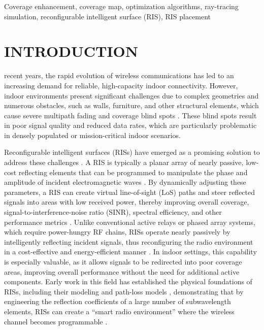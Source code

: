 \documentclass{IEEEoj}
\begin{document}
\begin{IEEEkeywords}
Coverage enhancement, coverage map, optimization algorithms, ray-tracing simulation, reconfigurable intelligent surface (RIS), RIS placement
\end{IEEEkeywords}


\maketitle

\section{INTRODUCTION}
 recent years, the rapid evolution of wireless communications has led to an increasing demand for reliable, high-capacity indoor connectivity. However, indoor environments present significant challenges due to complex geometries and numerous obstacles, such as walls, furniture, and other structural elements, which cause severe multipath fading and coverage blind spots \cite{wu_towards}. These blind spots result in poor signal quality and reduced data rates, which are particularly problematic in densely populated or mission-critical indoor scenarios.

Reconfigurable intelligent surfaces (RISs) have emerged as a promising solution to address these challenges \cite{e_basar}. A RIS is typically a planar array of nearly passive, low-cost reflecting elements that can be programmed to manipulate the phase and amplitude of incident electromagnetic waves \cite{di_renzo_SRE}. By dynamically adjusting these parameters, a RIS can create virtual line-of-sight (LoS) paths and steer reflected signals into areas with low received power, thereby improving overall coverage, signal-to-interference-noise ratio (SINR), spectral efficiency, and other performance metrics \cite{elmossalmy}. Unlike conventional active relays or phased array systems, which require power-hungry RF chains, RISs operate nearly passively by intelligently reflecting incident signals, thus reconfiguring the radio environment in a cost-effective and energy-efficient manner \cite{Wu_IRS_Integre}. In indoor settings, this capability is especially valuable, as it allows signals to be redirected into poor coverage areas, improving overall performance without the need for additional active components. Early work in this field has established the physical foundations of RISs, including their modeling and path-loss models \cite{path-loss1,path-loss2,Tang}, demonstrating that by engineering the reflection coefficients of a large number of subwavelength elements, RISs can create a “smart radio environment” where the wireless channel becomes programmable \cite{pan2021reconfigurable}.
\end{document}

